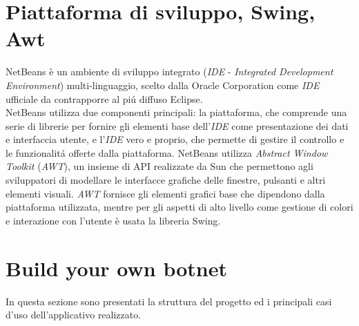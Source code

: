 \section{Piattaforma di sviluppo, Swing, Awt}
NetBeans \`e un ambiente di sviluppo integrato (\textit{IDE} -  \textit{Integrated Development Environment}) multi-linguaggio, scelto dalla Oracle Corporation come \textit{IDE} ufficiale da contrapporre al pi\'u diffuso Eclipse.\\
NetBeans utilizza due componenti principali: la piattaforma, che comprende una serie di librerie per fornire gli elementi base dell'\textit{IDE} come presentazione dei dati e interfaccia utente, e l'\textit{IDE} vero e proprio, che permette di gestire il controllo e le funzionalit\'a offerte dalla piattaforma. NetBeans utilizza \textit{Abstract Window Toolkit} (\textit{AWT}), un insieme di API realizzate da Sun che permettono agli sviluppatori di modellare le interfacce grafiche delle finestre, pulsanti e altri elementi visuali. \textit{AWT} fornisce gli elementi grafici base che dipendono dalla piattaforma utilizzata, mentre per gli aspetti di alto livello come gestione di colori e interazione con l'utente \`e usata la libreria Swing.

\vspace*{1cm}
\section{Build your own botnet}
In questa sezione sono presentati la struttura del progetto ed i principali casi d'uso dell'applicativo realizzato.

\vspace*{0.5cm}
